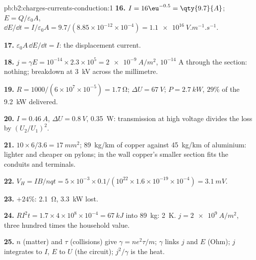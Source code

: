 \begin{solution}{pb:b2:charges-currents-conduction:1}
\textbf{16.} $I = 16\eu^{-0.5} = \qty{9.7}{A}$; $E = Q/\varepsilon_0A$, $\dd E/\dd t = I/\varepsilon_0A
= 9.7/(8.85 \times 10^{-12} \times 10^{-4}) = \qty{1.1e16}{V.m^{-1}.s^{-1}}$.

\textbf{17.} $\varepsilon_0A\,\dd E/\dd t = I$: the displacement current.

\textbf{18.} $j = \gamma E = 10^{-14} \times 2.3 \times 10^5 = \qty{2e-9}{A/m^2}$, $10^{-14}$ A
through the section: nothing; breakdown at \qty{3}{kV} across the millimetre.

\textbf{19.} $R = 1000/(6 \times 10^7 \times 10^{-5}) = \qty{1.7}{\ohm}$; $\Delta U = \qty{67}{V}$; $P =
\qty{2.7}{kW}$, $29\%$ of the \qty{9.2}{kW} delivered.

\textbf{20.} $I = \qty{0.46}{A}$, $\Delta U = \qty{0.8}{V}$, \qty{0.35}{W}: transmission at
high voltage divides the loss by $(U_2/U_1)^2$.

\textbf{21.} $10 \times 6/3.6 = \qty{17}{mm^2}$; \qty{89}{kg/km} of copper against
\qty{45}{kg/km} of aluminium: lighter and cheaper on pylons; in the wall
copper's smaller section fits the conduits and terminals.

\textbf{22.} $V_H = IB/nqt = 5 \times 10^{-3} \times 0.1/(10^{22} \times 1.6 \times 10^{-19} \times 10^{-4}) =
\qty{3.1}{mV}$.

\textbf{23.} $+24\%$: \qty{2.1}{\ohm}, \qty{3.3}{kW} lost.

\textbf{24.} $RI^2t = 1.7 \times 4 \times 10^8 \times 10^{-4} = \qty{67}{kJ}$ into \qty{89}{kg}: \qty{2}{K}.
$j = \qty{2e9}{A/m^2}$, three hundred times the household value.

\textbf{25.} $n$ (matter) and $\tau$ (collisions) give $\gamma = ne^2\tau/m$;
$\gamma$ links $j$ and $E$ (Ohm); $j$ integrates to $I$, $E$ to $U$ (the
circuit); $j^2/\gamma$ is the heat.
\end{solution}
